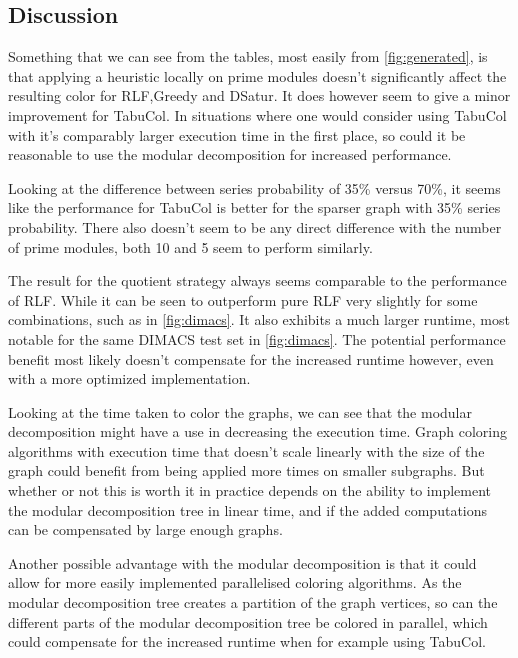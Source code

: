 \documentclass[a4paper]{article}
\begin{document}
\FloatBarrier
\subsection{Discussion}

Something that we can see from the tables, most easily from
\autoref{fig:generated}, is that applying a heuristic locally on prime modules
doesn't significantly affect the resulting color for RLF,Greedy and DSatur. It
does however seem to give a minor improvement for TabuCol. In situations where
one would consider using TabuCol with it's comparably larger execution time in
the first place, so could it be reasonable to use the modular decomposition for
increased performance.

Looking at the difference between series probability of 35\% versus 70\%, it
seems like the performance for TabuCol is better for the sparser graph with
35\% series probability. There also doesn't seem to be any direct difference
with the number of prime modules, both 10 and 5 seem to perform similarly.

The result for the quotient strategy always seems comparable to the performance
of RLF. While it can be seen to outperform pure RLF very slightly for some
combinations, such as in \autoref{fig:dimacs}. It also exhibits a much larger
runtime, most notable for the same DIMACS test set in \autoref{fig:dimacs}.  The
potential performance benefit most likely doesn't compensate for the increased
runtime however, even with a more optimized implementation.

Looking at the time taken to color the graphs, we can see that the modular
decomposition might have a use in decreasing the execution time. Graph coloring
algorithms with execution time that doesn't scale linearly with the size of the
graph could benefit from being applied more times on smaller subgraphs. But
whether or not this is worth it in practice depends on the ability to implement
the modular decomposition tree in linear time, and if the added computations
can be compensated by large enough graphs.

Another possible advantage with the modular decomposition is that it could
allow for more easily implemented parallelised coloring algorithms. As the
modular decomposition tree creates a partition of the graph vertices, so can
the different parts of the modular decomposition tree be colored in parallel,
which could compensate for the increased runtime when for example using TabuCol.

\printbibliography
\end{document}
